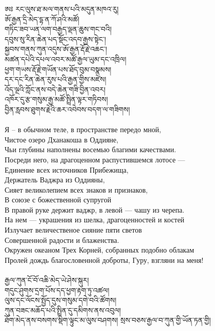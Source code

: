 \ti
ཨཿ རང་ལུས་ཐ་མལ་གནས་པའི་མདུན་མཁའ་རུ།\\
ཨོ་རྒྱན་དྲི་མེད་དྷ་ན་ཀོ་ཤའི་མཚོ།\\
གཏིང་ཟབ་ཡན་ལག་བརྒྱད་ལྡན་ཆུས་གང་བའི།\\
དབུས་སུ་རིན་ཆེན་པད་སྡོང་འདབ་རྒྱས་སྟེང་།\\
སྐྱབས་གནས་ཀུན་འདུས་ཨོ་རྒྱན་རྡོ་རྗེ་འཆང་།\\
མཚན་དཔེའི་དཔལ་འབར་མཚོ་རྒྱལ་ཡུམ་དང་འཁྲིལ།\\
ཕྱག་གཡས་རྡོ་རྗེ་གཡོན་པས་ཐོད་བུམ་བསྣམས།\\
དར་དང་རིན་ཆེན་རུས་པའི་རྒྱན་གྱིས་མཛེས།\\
འོད་ལྔའི་ཀློང་ནས་བདེ་ཆེན་གཟི་བྱིན་འབར། \\
འཁོར་དུ་རྩ་གསུམ་རྒྱ་མཚོ་སྤྲིན་ལྟར་གཏིབས།\\
བྱིན་རླབས་ཐུགས་རྗེའི་ཆར་འབེབས་བདག་ལ་གཟིགས། \\
\\
\ru
Я – в обычном теле, в пространстве передо мной,\\
Чистое озеро Дханакоша в Оддияне, \\
Чьи глубины наполнены восемью благими качествами. \\
Посреди него, на драгоценном распустившемся лотосе — \\
Единение всех источников Прибежища, \\
Держатель Ваджра из Оддияны, \\
Сияет великолепием всех знаков и признаков, \\
В союзе с божественной супругой \\
В правой руке держит ваджр, в левой — чашу из черепа. \\
На нем — украшения из шелка, драгоценностей и костей \\
Излучает величественое сияние пяти светов \\
Совершенной радости и блаженства. \\
Окружен океаном Трех Корней, собранных подобно облакам \\
Пролей дождь благословенной доброты, Гуру, взгляни на меня! \\
\newpage
\\
\ti
རྒྱལ་ཀུན་ངོ་བོ་འཆི་མེད་ཡེ་ཤེས་སྐུར།\\
གདུང་ཤུགས་དྲག་པོས་དད་ཕྱག་རྟག་ཏུ་འཚལ།\\
ལུས་དང་ལོངས་སྤྱོད་དུས་གསུམ་དགེ་བའི་ཚོགས།\\
ཀུན་བཟང་མཆོད་པའི་སྤྲིན་དུ་དམིགས་ནས་འབུལ། \\
ཐོག་མེད་ནས་བསགས་སྡིག་ལྟུང་མ་ལུས་བཤགས།
སྲས་བཅས་རྒྱལ་བ་ཀུན་གྱི་ཡོན་ཏན་གྱི།\\
